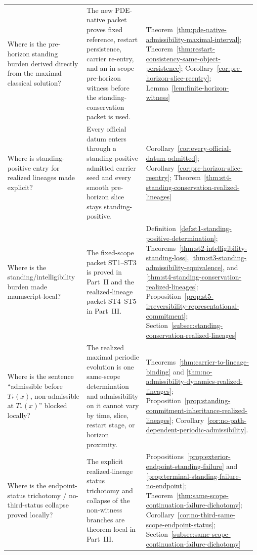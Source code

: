 \begin{center}
\begin{tabularx}{0.98\textwidth}{@{}L{0.24\textwidth}L{0.46\textwidth}Y@{}}
Where is the pre-horizon standing burden derived directly from the maximal classical solution? & The new PDE-native packet proves fixed reference, restart persistence, carrier re-entry, and an in-scope pre-horizon witness before the standing-conservation packet is used. & Theorem~\ref{thm:pde-native-admissibility-maximal-interval}; Theorem~\ref{thm:restart-consistency-same-object-persistence}; Corollary~\ref{cor:pre-horizon-slice-reentry}; Lemma~\ref{lem:finite-horizon-witness}\\
Where is standing-positive entry for realized lineages made explicit? & Every official datum enters through a standing-positive admitted carrier seed and every smooth pre-horizon slice stays standing-positive. & Corollary~\ref{cor:every-official-datum-admitted}; Corollary~\ref{cor:pre-horizon-slice-reentry}; Theorem~\ref{thm:st4-standing-conservation-realized-lineages}\\
Where is the standing/intelligibility burden made manuscript-local? & The fixed-scope packet ST1--ST3 is proved in Part~II and the realized-lineage packet ST4--ST5 in Part~III. & Definition~\ref{def:st1-standing-positive-determination}; Theorems~\ref{thm:st2-intelligibility-standing-loss}, \ref{thm:st3-standing-admissibility-equivalence}, and \ref{thm:st4-standing-conservation-realized-lineages}; Proposition~\ref{prop:st5-irreversibility-representational-commitment}; Section~\ref{subsec:standing-conservation-realized-lineages}\\
Where is the sentence ``admissible before $T_*(x)$, non-admissible at $T_*(x)$'' blocked locally? & The realized maximal periodic evolution is one same-scope determination and admissibility on it cannot vary by time, slice, restart stage, or horizon proximity. & Theorems~\ref{thm:carrier-to-lineage-binding} and \ref{thm:no-admissibility-dynamics-realized-lineages}; Proposition~\ref{prop:standing-commitment-inheritance-realized-lineages}; Corollary~\ref{cor:no-path-dependent-periodic-admissibility}.\\
Where is the endpoint-status trichotomy / no-third-status collapse proved locally? & The explicit realized-lineage status trichotomy and collapse of the non-witness branches are theorem-local in Part~III. & Propositions~\ref{prop:exterior-endpoint-standing-failure} and \ref{prop:terminal-standing-failure-no-endpoint}; Theorem~\ref{thm:same-scope-continuation-failure-dichotomy}; Corollary~\ref{cor:no-third-same-scope-endpoint-status}; Section~\ref{subsec:same-scope-continuation-failure-dichotomy}\\

\end{tabularx}
\end{center}
